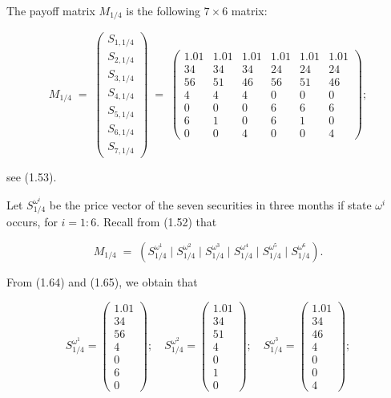 The payoff matrix $M_{1/4}$ is the following $7\times 6$ matrix:

\begin{equation}
M_{1/4} \;=\;
\begin{pmatrix} S_{1,1/4} \\ S_{2,1/4} \\ S_{3,1/4} \\ S_{4,1/4} \\ S_{5,1/4} \\ S_{6,1/4} \\ S_{7,1/4} \end{pmatrix}
\;=\;
\begin{pmatrix}
1.01 & 1.01 & 1.01 & 1.01 & 1.01 & 1.01 \\
34 & 34 & 34 & 24 & 24 & 24 \\
56 & 51 & 46 & 56 & 51 & 46 \\
4 & 4 & 4 & 0 & 0 & 0 \\
0 & 0 & 0 & 6 & 6 & 6 \\
6 & 1 & 0 & 6 & 1 & 0 \\
0 & 0 & 4 & 0 & 0 & 4
\end{pmatrix};
\end{equation}

see (1.53).

Let $S_{1/4}^{\omega^i}$ be the price vector of the seven securities in
three months if state $\omega^i$ occurs, for $i=1:6$. Recall from (1.52)
that

\begin{equation}
M_{1/4} \;=\; \left(S_{1/4}^{\omega^1}\mid S_{1/4}^{\omega^2}\mid
S_{1/4}^{\omega^3}\mid S_{1/4}^{\omega^4}\mid S_{1/4}^{\omega^5}\mid
S_{1/4}^{\omega^6}\right).
\end{equation}

From (1.64) and (1.65), we obtain that

\[
S_{1/4}^{\omega^1} = \begin{pmatrix}1.01\\34\\56\\4\\0\\6\\0\end{pmatrix}; \quad
S_{1/4}^{\omega^2} = \begin{pmatrix}1.01\\34\\51\\4\\0\\1\\0\end{pmatrix}; \quad
S_{1/4}^{\omega^3} = \begin{pmatrix}1.01\\34\\46\\4\\0\\0\\4\end{pmatrix};
\]

